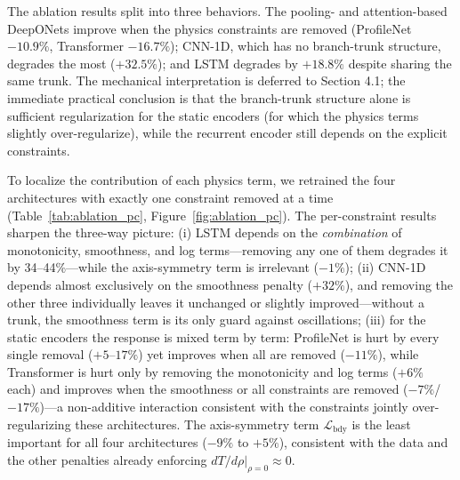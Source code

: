 \documentclass[a4paper,12pt]{article}
\begin{document}
The ablation results split into three behaviors. The pooling- and attention-based DeepONets improve when the physics constraints are removed (ProfileNet $-10.9\%$, Transformer $-16.7\%$); CNN-1D, which has no branch-trunk structure, degrades the most ($+32.5\%$); and LSTM degrades by $+18.8\%$ despite sharing the same trunk. The mechanical interpretation is deferred to Section 4.1; the immediate practical conclusion is that the branch-trunk structure alone is sufficient regularization for the static encoders (for which the physics terms slightly over-regularize), while the recurrent encoder still depends on the explicit constraints.

To localize the contribution of each physics term, we retrained the four architectures with exactly one constraint removed at a time (Table~\ref{tab:ablation_pc}, Figure~\ref{fig:ablation_pc}). The per-constraint results sharpen the three-way picture: (i) LSTM depends on the \textit{combination} of monotonicity, smoothness, and log terms---removing any one of them degrades it by 34--44\%---while the axis-symmetry term is irrelevant ($-1\%$); (ii) CNN-1D depends almost exclusively on the smoothness penalty ($+32\%$), and removing the other three individually leaves it unchanged or slightly improved---without a trunk, the smoothness term is its only guard against oscillations; (iii) for the static encoders the response is mixed term by term: ProfileNet is hurt by every single removal ($+5$--$17\%$) yet improves when all are removed ($-11\%$), while Transformer is hurt only by removing the monotonicity and log terms ($+6\%$ each) and improves when the smoothness or all constraints are removed ($-7\%$/$-17\%$)---a non-additive interaction consistent with the constraints jointly over-regularizing these architectures. The axis-symmetry term $\mathcal{L}_{\text{bdy}}$ is the least important for all four architectures ($-9\%$ to $+5\%$), consistent with the data and the other penalties already enforcing $dT/d\rho|_{\rho=0}\approx 0$.
\end{document}
